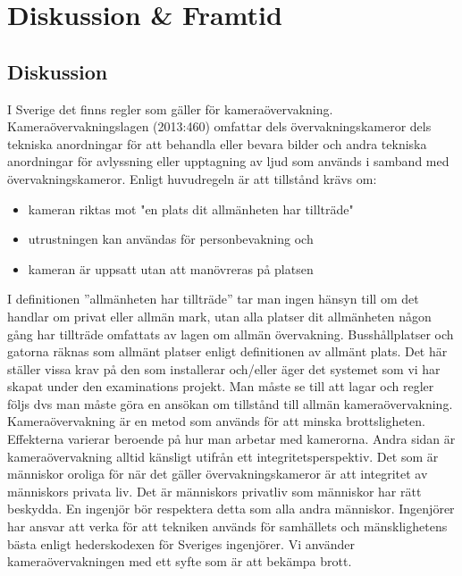 
\chapter{Diskussion \& Framtid} %
\label{ch:diskussion}


\ifpdf
    \graphicspath{{7/figures/PNG/}{7/figures/PDF/}{7/figures/}}
\else
    \graphicspath{{7/figures/EPS/}{7/figures/}}
\fi





\section{Diskussion}
I Sverige det finns regler som gäller för kameraövervakning. Kameraövervakningslagen (2013:460) omfattar dels övervakningskameror dels tekniska anordningar för att behandla eller bevara bilder och andra tekniska anordningar för avlyssning eller upptagning av ljud som används i samband med övervakningskameror. 
Enligt huvudregeln är att tillstånd krävs om:

\begin{itemize}
\item kameran riktas mot "en plats dit allmänheten har tillträde"

\item utrustningen kan användas för personbevakning och

\item kameran är uppsatt utan att manövreras på platsen
\end{itemize}
I definitionen ”allmänheten har tillträde” tar man ingen hänsyn till om det handlar om privat eller allmän mark, utan alla platser dit allmänheten någon gång har tillträde omfattats av lagen om allmän övervakning. Busshållplatser och gatorna räknas som allmänt platser enligt definitionen av allmänt plats.  Det här ställer vissa krav på den som installerar och/eller äger det systemet som vi har skapat under den examinations projekt. Man måste se till att lagar och regler följs dvs man måste göra en ansökan om tillstånd till allmän kameraövervakning. 
Kameraövervakning är en metod som används för att minska brottsligheten. Effekterna varierar beroende på hur man arbetar med kamerorna. Andra sidan är kameraövervakning alltid känsligt utifrån ett integritetsperspektiv. Det som är människor oroliga för när det gäller övervakningskameror är att integritet av människors privata liv.  Det är människors privatliv som människor har rätt beskydda. En ingenjör bör respektera detta som alla andra människor. Ingenjörer har ansvar att verka för att tekniken används för samhällets och mänsklighetens bästa enligt hederskodexen för Sveriges ingenjörer. Vi använder kameraövervakningen med ett syfte som är att bekämpa brott. 





